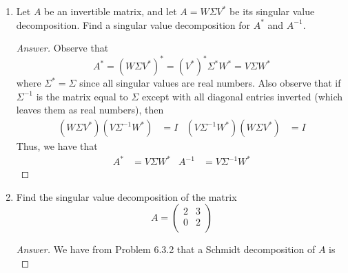 \documentclass[../psets.tex]{subfiles}
\begin{document}
\begin{enumerate}[label={\textbf{3.\arabic*.}}]
\begin{proof}[Answer]
\begin{equation*}
            +\sqrt{3}
            \begin{pmatrix}
                1/\sqrt{3}\\
                1/\sqrt{3}\\
                1/\sqrt{3}\\
            \end{pmatrix}
            \begin{pmatrix}
                0 & 1\\
            \end{pmatrix}
        \end{equation*}
    \end{proof}
    \item Let $A$ be an invertible matrix, and let $A=W\Sigma V^*$ be its singular value decomposition. Find a singular value decomposition for $A^*$ and $A^{-1}$.
    \begin{proof}[Answer]
        Observe that
        \begin{equation*}
            A^* = (W\Sigma V^*)^* = (V^*)^*\Sigma^*W^* = V\Sigma W^*
        \end{equation*}
        where $\Sigma^*=\Sigma$ since all singular values are real numbers. Also observe that if $\Sigma^{-1}$ is the matrix equal to $\Sigma$ except with all diagonal entries inverted (which leaves them as real numbers), then
        \begin{align*}
            (W\Sigma V^*)(V\Sigma^{-1}W^*) &= I&
            (V\Sigma^{-1}W^*)(W\Sigma V^*) &= I
        \end{align*}
        Thus, we have that
        \begin{align*}
            A^* &= V\Sigma W^*&
                A^{-1} &= V\Sigma^{-1}W^*
        \end{align*}
    \end{proof}
    \item Find the singular value decomposition of the matrix
    \begin{equation*}
        A =
        \begin{pmatrix}
            2 & 3\\
            0 & 2\\
        \end{pmatrix}
    \end{equation*}
    \begin{proof}[Answer]
        We have from Problem 6.3.2 that a Schmidt decomposition of $A$ is
        \begin{equation*}

\end{equation*}
\end{proof}
\end{enumerate}
\end{document}

